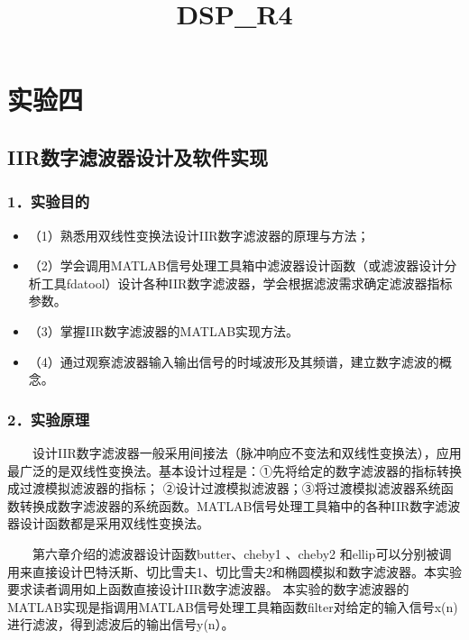 \documentclass[11pt]{article}
\title{DSP\_R4}
\providecommand{\tightlist}{%
      \setlength{\itemsep}{0pt}\setlength{\parskip}{0pt}}
\begin{document}
    
    
    \maketitle
    
    

    
    \section{实验四}\label{ux5b9eux9a8cux56db}

\subsection{IIR数字滤波器设计及软件实现}\label{iirux6570ux5b57ux6ee4ux6ce2ux5668ux8bbeux8ba1ux53caux8f6fux4ef6ux5b9eux73b0}

\subsubsection{1．实验目的}\label{ux5b9eux9a8cux76eeux7684}

\begin{itemize}
\tightlist
\item
  （1）熟悉用双线性变换法设计IIR数字滤波器的原理与方法；
\item
  （2）学会调用MATLAB信号处理工具箱中滤波器设计函数（或滤波器设计分析工具fdatool）设计各种IIR数字滤波器，学会根据滤波需求确定滤波器指标参数。
\item
  （3）掌握IIR数字滤波器的MATLAB实现方法。
\item
  （4）通过观察滤波器输入输出信号的时域波形及其频谱，建立数字滤波的概念。
\end{itemize}

\subsubsection{2．实验原理}\label{ux5b9eux9a8cux539fux7406}

  设计IIR数字滤波器一般采用间接法（脉冲响应不变法和双线性变换法），应用最广泛的是双线性变换法。基本设计过程是：①先将给定的数字滤波器的指标转换成过渡模拟滤波器的指标；
②设计过渡模拟滤波器；③将过渡模拟滤波器系统函数转换成数字滤波器的系统函数。MATLAB信号处理工具箱中的各种IIR数字滤波器设计函数都是采用双线性变换法。

  第六章介绍的滤波器设计函数butter、cheby1 、cheby2
和ellip可以分别被调用来直接设计巴特沃斯、切比雪夫1、切比雪夫2和椭圆模拟和数字滤波器。本实验要求读者调用如上函数直接设计IIR数字滤波器。
本实验的数字滤波器的MATLAB实现是指调用MATLAB信号处理工具箱函数filter对给定的输入信号x(n)进行滤波，得到滤波后的输出信号y(n）。
\end{document}
